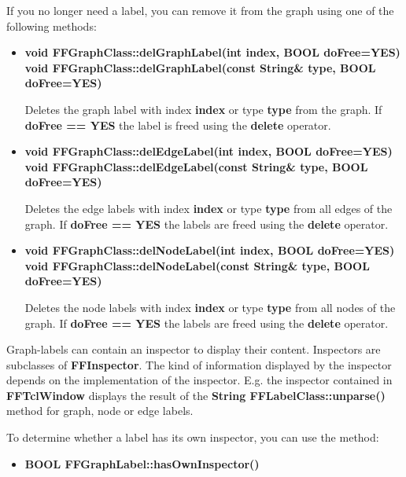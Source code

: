 If you no longer need a label, you can remove it from the graph
using one of the following methods:

\begin{itemize}
  
\item{\bf void FFGraphClass::delGraphLabel(int index, BOOL
    doFree=YES) \\
    void FFGraphClass::delGraphLabel(const String\& type,
    BOOL doFree=YES)}
  
  Deletes the graph label with index {\bf index} or type {\bf
    type} from the graph. If {\bf doFree == YES} the label is
  freed using the {\bf delete} operator.
  
\item{\bf void FFGraphClass::delEdgeLabel(int index, BOOL
    doFree=YES) \\
    void FFGraphClass::delEdgeLabel(const String\& type,
    BOOL doFree=YES)}
  
  Deletes the edge labels with index {\bf index} or type {\bf
    type} from all edges of the graph. If {\bf doFree == YES} the
  labels are freed using the {\bf delete} operator.
  
\item{\bf void FFGraphClass::delNodeLabel(int index, BOOL
    doFree=YES) \\
    void FFGraphClass::delNodeLabel(const String\& type,
    BOOL doFree=YES)}
  
  Deletes the node labels with index {\bf index} or type {\bf
    type} from all nodes of the graph. If {\bf doFree == YES} the
  labels are freed using the {\bf delete} operator.

\end{itemize}

Graph-labels can contain an inspector to display their
content. Inspectors are subclasses of {\bf FFInspector}. The kind of
information displayed by the inspector depends on the implementation
of the inspector. E.g. the inspector contained in {\bf FFTclWindow}
displays the result of the {\bf String FFLabelClass::unparse()} method
for graph, node or edge labels.

To determine whether a label has its own inspector, you can use the
method:

\begin{itemize}

\item{\bf BOOL FFGraphLabel::hasOwnInspector()}

\end{itemize}


